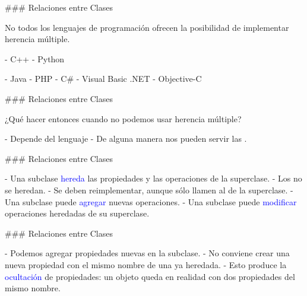 \importantboxend

### Relaciones entre Clases

\newline

No todos los lenguajes de programación ofrecen la posibilidad de implementar herencia múltiple.

\vspace{-2em}
\columnsbegin



- C++
- Python

\importantboxend




- Java
- PHP
- C#
- Visual Basic .NET
- Objective-C

\importantboxend

\columnsend

### Relaciones entre Clases

\newline

¿Qué hacer entonces cuando no podemos usar herencia múltiple?

- Depende del lenguaje
- De alguna manera nos pueden servir las .

### Relaciones entre Clases

\newline

- Una subclase \textcolor{blue}{hereda} las propiedades y las operaciones de la superclase.
    - Los  no se heredan.
    - Se deben reimplementar, aunque sólo llamen al de la superclase.
- Una subclase puede \textcolor{blue}{agregar} nuevas operaciones.
- Una subclase puede \textcolor{blue}{modificar} operaciones heredadas de su superclase.

### Relaciones entre Clases

\newline

- Podemos agregar propiedades nuevas en la subclase.
- No conviene crear una nueva propiedad con el mismo nombre de una ya heredada.
    - Esto produce la \textcolor{blue}{ocultación} de propiedades: un objeto queda en realidad con
    dos propiedades del mismo nombre.

